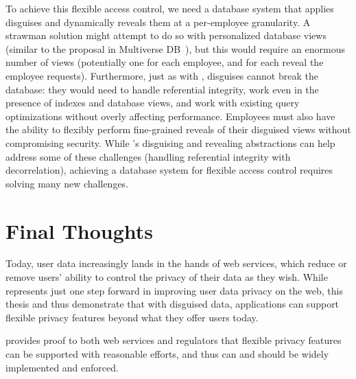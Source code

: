 %
To achieve this flexible access control, we need a database system that applies
disguises and dynamically reveals them at a per-employee granularity.
%
A strawman solution might attempt to do so with personalized database views
(similar to the proposal in Multiverse DB~\cite{multiverse}), but this would
require an enormous number of views (potentially one for each employee, and for
each reveal the employee requests).
%
Furthermore, just as with \sys, disguises cannot break the database: they would
need to handle referential integrity, work even in the presence of indexes and
database views, and work with existing query optimizations without overly
affecting performance.
%
Employees must also have the ability to flexibly perform fine-grained reveals of
their disguised views without compromising security.
%
While \sys's disguising and revealing abstractions can help address some of
these challenges (\eg handling referential integrity with decorrelation),
achieving a database system for flexible access control requires solving many
new challenges.

%
%
%
\section{Final Thoughts}
Today, user data increasingly lands in the hands of web services, which reduce
or remove users' ability to control the privacy of their data as they wish.
%
While \sys represents just one step forward in improving user data privacy on
the web, this thesis and \sys thus demonstrate that with disguised data,
applications can support flexible privacy features beyond what they offer users
today.


\sys provides proof to both web services and regulators that flexible
privacy features can be supported with reasonable efforts, and thus can and
should be widely implemented and enforced.
%
